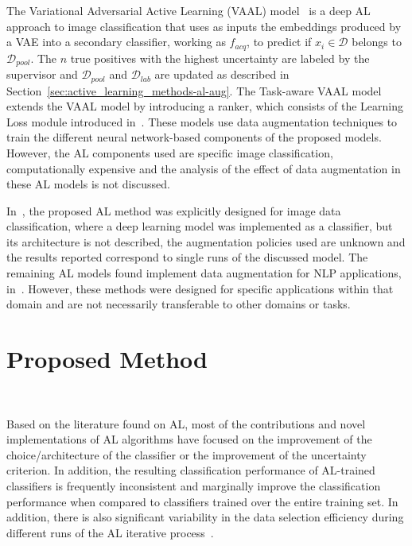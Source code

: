The Variational Adversarial Active Learning (VAAL)
model~\cite{sinha2019variational} is a deep AL approach to image
classification that uses as inputs the embeddings produced by a VAE into a
secondary classifier, working as $f_{acq}$, to predict if $x_i \in
\mathcal{D}$ belongs to $\mathcal{D}_{pool}$. The $n$ true positives with the
highest uncertainty are labeled by the supervisor and
$\mathcal{D}_{pool}$ and $\mathcal{D}_{lab}$ are updated as described in
Section~\ref{sec:active_learning_methods-al-aug}. The Task-aware VAAL
model~\cite{kim2021task} extends the VAAL model by introducing a ranker, which
consists of the Learning Loss module introduced in~\cite{Yoo2019}. These
models use data augmentation techniques to train the different neural
network-based components of the proposed models. However, the AL components
used are specific image classification, computationally expensive and the
analysis of the effect of data augmentation in these AL models is not
discussed.

In~\cite{Ma2020}, the proposed AL method was explicitly designed for image
data classification, where a deep learning model was implemented as a
classifier, but its architecture is not described, the augmentation policies
used are unknown and the results reported correspond to single runs of the
discussed model. The remaining AL models found implement data augmentation for
NLP applications, in~\cite{Quteineh2020, Li2021framework}. However, these
methods were designed for specific applications within that domain and are not
necessarily transferable to other domains or tasks.

\section{Proposed Method}~\label{sec:proposed_method-al-aug}

Based on the literature found on AL, most of the contributions and novel
implementations of AL algorithms have focused on the improvement of the
choice/architecture of the classifier or the improvement of the uncertainty
criterion. In addition, the resulting classification performance of AL-trained
classifiers is frequently inconsistent and marginally improve the
classification performance when compared to classifiers trained over the
entire training set. In addition, there is also significant variability in the
data selection efficiency during different runs of the AL iterative
process~\cite{Fonseca2021al}.
 
